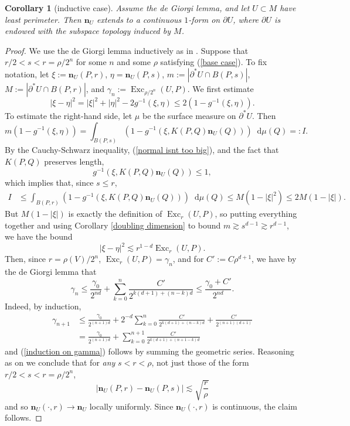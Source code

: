 \documentclass[reqno,11pt]{amsart}
\DeclareMathOperator{\Exc}{Exc}
\newcommand*\dif{\mathop{}\!\mathrm{d}}
\newcommand{\normal}{\mathbf n}
\newtheorem{corollary}[theorem]{Corollary}
\theoremstyle{definition}
\numberwithin{equation}{section}
\begin{document}
\begin{corollary}[inductive case]
Assume the de Giorgi lemma, and let $U \subset M$ have least perimeter.
Then $\normal_U$ extends to a continuous $1$-form on $\partial U$, where $\partial U$ is endowed with the subspace topology induced by $M$.
\end{corollary}
\begin{proof}
We use the de Giorgi lemma inductively as in \cite[Theorem 8.2]{Giusti77}.
Suppose that $r/2 < s < r = \rho/2^n$ for some $n$ and some $\rho$ satisfying (\ref{base case}).
To fix notation, let
$\xi := \normal_U(P, r)$, $\eta = \normal_U(P, s)$, $m := |\partial^* U \cap B(P, s)|$, $M := |\partial^* U \cap B(P, r)|$, and $\gamma_n := \Exc_{\rho/2^n}(U, P)$.
We first estimate
$$|\xi - \eta|^2 = |\xi|^2 + |\eta|^2 - 2 g^{-1}(\xi, \eta) \leq 2(1 - g^{-1}(\xi, \eta)).$$
To estimate the right-hand side, let $\mu$ be the surface measure on $\partial^* U$. Then
$$m(1 - g^{-1}(\xi, \eta)) = \int_{B(P, s)} (1 - g^{-1}(\xi, K(P, Q) \normal_U(Q))) \dif \mu(Q) =: I.$$
By the Cauchy-Schwarz inequality, (\ref{normal isnt too big}), and the fact that $K(P, Q)$ preserves length,
$$g^{-1}(\xi, K(P, Q) \normal_U(Q)) \leq 1,$$
which implies that, since $s \leq r$,
\begin{align*}
I
&\leq \int_{B(P, r)} (1 - g^{-1}(\xi, K(P, Q) \normal_U(Q))) \dif \mu(Q) 
\leq M(1 - |\xi|^2) \leq 2M(1 - |\xi|).
\end{align*}
But $M(1 - |\xi|)$ is exactly the definition of $\Exc_r(U, P)$, so putting everything together and using Corollary \ref{doubling dimension} to bound $m \gtrsim s^{d - 1} \gtrsim r^{d - 1}$, we have the bound
\begin{equation}\label{just need the excess}
|\xi - \eta|^2 \lesssim r^{1 - d} \Exc_r(U, P).
\end{equation}
Then, since $r = \rho(V)/2^n$, $\Exc_r(U, P) = \gamma_n$, and for $C' := C\rho^{d + 1}$, we have by the de Giorgi lemma that
\begin{equation}\label{induction on gamma}
\gamma_n \leq \frac{\gamma_0}{2^{nd}} + \sum_{k=0}^n \frac{C'}{2^{k(d + 1) + (n - k)d}} \leq \frac{\gamma_0 + C'}{2^{nd}}.
\end{equation}
Indeed, by induction,
\begin{align*}
\gamma_{n + 1}
&\leq \frac{\gamma_0}{2^{(n + 1)d}} + 2^{-d} \sum_{k=0}^n \frac{C'}{2^{k(d + 1) + (n - k)d}} + \frac{C'}{2^{(n + 1)(d + 1)}} \\
&= \frac{\gamma_0}{2^{(n + 1)d}} + \sum_{k=0}^{n + 1} \frac{C'}{2^{k(d + 1) + (n + 1 - k)d}}
\end{align*}
and (\ref{induction on gamma}) follows by summing the geometric series.
Reasoning as on \cite[pg100]{Giusti77} we conclude that for \emph{any} $s < r < \rho$, not just those of the form $r/2 < s < r = \rho/2^n$,
$$|\normal_U(P, r) - \normal_U(P, s)| \lesssim \sqrt{\frac{r}{\rho}}$$
and so $\normal_U(\cdot, r) \to \normal_U$ locally uniformly.
Since $\normal_U(\cdot, r)$ is continuous, the claim follows.
\end{proof}
\end{document}
